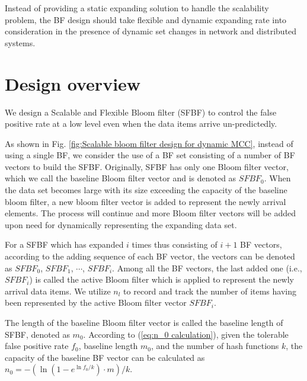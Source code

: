 \documentclass[10pt,journal,compsoc]{IEEEtran}
\begin{document}
Instead of providing a static expanding solution to handle the scalability problem, the BF design should take flexible and dynamic expanding rate into consideration in the presence of  dynamic set changes in network and distributed systems.




\section{Design overview}
\label{sec:Scalable and rate-dependent bloom filter}
We design a Scalable and Flexible Bloom filter (SFBF) to control the false positive rate at a low level even when the data items arrive un-predictedly.

As shown in Fig. \ref{fig:Scalable bloom filter design for dynamic MCC}, instead of using a single BF, we consider the use of a BF set consisting of a number of BF vectors to build the SFBF. Originally, SFBF has only one Bloom filter vector, which we call the baseline Bloom filter vector and is denoted as $SFBF_0$. When the data set becomes large with its size exceeding the capacity of the baseline bloom filter, a new bloom filter vector is added to represent the newly arrival elements. The process will continue and more Bloom filter vectors will be added  upon need  for dynamically representing the expanding data set.

For a SFBF which has expanded $i$ times thus consisting of $i+1$ BF vectors, according to the adding sequence of each BF vector, the vectors can be denoted as $SFBF_0$, $SFBF_1$, $\cdots$, $SFBF_i$.
Among all the BF vectors,  the last added one (i.e., $SFBF_i$) is called the active Bloom filter which is applied to represent the newly arrival data items. We  utilize $n_l$ to record and track the number of items having been represented by the active Bloom filter vector $SFBF_i$.%

The length of the baseline Bloom filter vector is called the baseline length of SFBF, denoted as $m_0$. According to (\ref{eq:n_0 calculation}), given the tolerable false positive rate $f_0$, baseline length $m_0$, and the number of hash functions $k$, the capacity of the baseline BF vector can be calculated as ${n_0} =  - \left( {\ln \left( {1 - {e^{\ln {f_0}/k}}} \right) \cdot m} \right)/k$.
\end{document}
